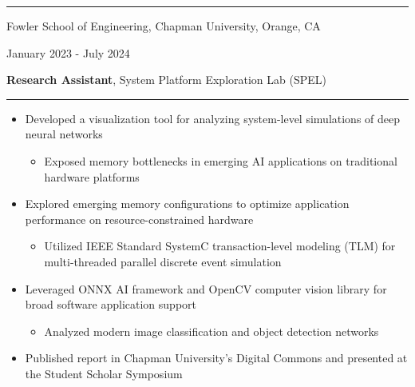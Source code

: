 \documentclass[letter]{article}
\begin{document}
    \vspace{4pt}
    \hrule height 1pt
    \vspace{4pt}
    \noindent
    \begin{minipage}[c]{0.65\linewidth}
        \noindent Fowler School of Engineering, Chapman University, Orange, CA
    \end{minipage}
    \begin{minipage}[c]{0.341\linewidth}
        \begin{flushright}
            January 2023 - July 2024
        \end{flushright}
    \end{minipage}
    \begin{minipage}[c]{0.65\linewidth}
        \noindent \textbf{Research Assistant}, System Platform Exploration Lab (SPEL)
    \end{minipage}
    \noindent
    \vspace{4pt}
    \hrule
    \vspace{4pt}
    \noindent
    \begin{itemize}[noitemsep, topsep=0pt]
        \item Developed a visualization tool for analyzing system-level simulations of deep neural networks
            \begin{itemize}[noitemsep, topsep=0pt]
            \item Exposed memory bottlenecks in emerging AI applications on traditional hardware platforms
            \end{itemize}
        \item Explored emerging memory configurations to optimize application performance on resource-constrained hardware
            \begin{itemize}[noitemsep, topsep=0pt]
            \item  Utilized IEEE Standard SystemC transaction-level modeling (TLM) for multi-threaded parallel discrete event simulation
            \end{itemize}
        \item Leveraged ONNX AI framework and OpenCV computer vision library for broad software application support
            \begin{itemize}[noitemsep, topsep=0pt]
            \item Analyzed modern image classification and object detection networks
            \end{itemize}
        \item Published report in Chapman University's Digital Commons and presented at the Student Scholar Symposium
    \end{itemize}
    \medskip
\end{document}
